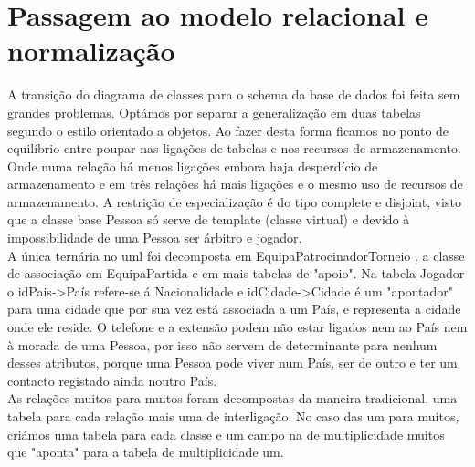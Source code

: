 \documentclass[a4paper]{article}
\begin{document}
\section{Passagem ao modelo relacional e normalização}
A transição do diagrama de classes para o schema da base de dados foi feita sem grandes problemas. Optámos por separar a generalização em duas tabelas segundo o estilo orientado a objetos. Ao fazer desta forma ficamos no ponto de equilíbrio entre poupar nas ligações de tabelas e nos recursos de armazenamento. Onde numa relação há menos ligações embora haja desperdício de armazenamento e em três relações há mais ligações e o mesmo uso de recursos de armazenamento. A restrição de especialização é do tipo complete e disjoint, visto que a classe base Pessoa só serve de template (classe virtual) e devido à impossibilidade de uma Pessoa ser árbitro e jogador.
\\\newline
A única ternária no uml foi decomposta em EquipaPatrocinadorTorneio , a classe de associação em EquipaPartida e em mais tabelas de "apoio". Na tabela Jogador o idPais->País refere-se á Nacionalidade e idCidade->Cidade é um "apontador" para uma cidade que por sua vez está associada a um País, e representa a cidade onde ele reside. O telefone e a extensão podem não estar ligados nem ao País nem à morada de uma Pessoa, por isso não servem de determinante para nenhum desses atributos, porque uma Pessoa pode viver num País, ser de outro e ter um contacto registado ainda noutro País.
\\\newline
As relações muitos para muitos foram decompostas da maneira tradicional, uma tabela para cada relação mais uma de interligação. No caso das um para muitos, criámos uma tabela para cada classe e um campo na de multiplicidade muitos que "aponta" para a tabela de multiplicidade um.
\clearpage
\end{document}
